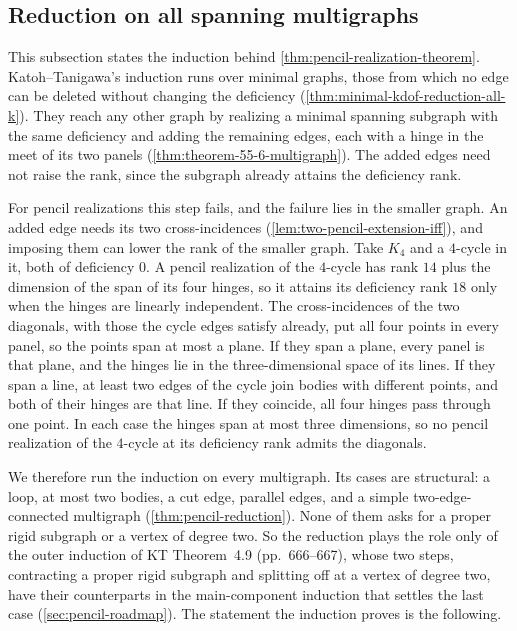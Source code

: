 \subsection{Reduction on all spanning multigraphs}
\label{sec:pencil-reduction}

This subsection states the induction behind
\cref{thm:pencil-realization-theorem}. Katoh--Tanigawa's induction runs
over minimal graphs, those from which no edge can be deleted without
changing the deficiency (\cref{thm:minimal-kdof-reduction-all-k}). They reach any
other graph by realizing a minimal spanning subgraph with the same
deficiency and adding the remaining edges, each with a hinge in the meet
of its two panels (\cref{thm:theorem-55-6-multigraph}). The added edges
need not raise the rank, since the subgraph already attains the
deficiency rank.

For pencil realizations this step fails, and the failure lies in the
smaller graph. An added edge needs its two cross-incidences
(\cref{lem:two-pencil-extension-iff}), and imposing them can lower the
rank of the smaller graph. Take $K_4$ and a $4$-cycle in it, both of
deficiency $0$. A pencil realization of the $4$-cycle has rank $14$ plus
the dimension of the span of its four hinges, so it attains its
deficiency rank $18$ only when the hinges are linearly independent. The cross-incidences
of the two diagonals, with those the cycle edges satisfy already, put all
four points in every panel, so the points span at most a plane. If they
span a plane, every panel is that plane, and the hinges lie in the
three-dimensional space of its lines. If they span a line, at least two
edges of the cycle join bodies with different points, and both of their
hinges are that line. If they coincide, all four hinges pass through one
point. In each case the hinges span at most three dimensions, so no
pencil realization of the $4$-cycle at its deficiency rank admits the
diagonals.

We therefore run the induction on every multigraph. Its cases are
structural: a loop, at most two bodies, a cut edge, parallel edges, and
a simple two-edge-connected multigraph (\cref{thm:pencil-reduction}).
None of them asks for a proper rigid subgraph or a vertex of degree two.
So the reduction plays the role only of the outer induction of KT
Theorem~4.9 (pp.~666--667), whose two steps, contracting a proper rigid
subgraph and splitting off at a vertex of degree two, have their
counterparts in the main-component induction that settles the last case
(\cref{sec:pencil-roadmap}). The statement the induction proves is the
following.

